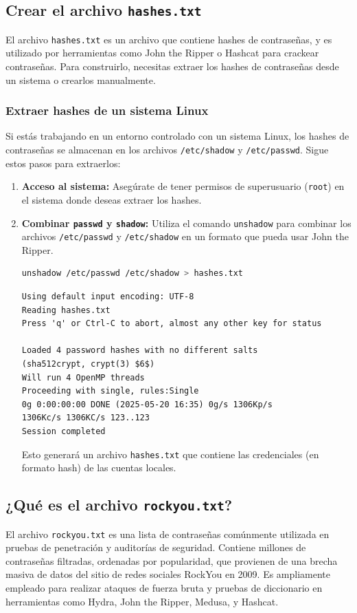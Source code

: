 \documentclass[12pt,a4paper]{article}
\begin{document}
\subsection*{Crear el archivo \texttt{hashes.txt}}
El archivo \texttt{hashes.txt} es un archivo que contiene hashes de contraseñas, y es utilizado por herramientas como John the Ripper o Hashcat para crackear contraseñas. Para construirlo, necesitas extraer los hashes de contraseñas desde un sistema o crearlos manualmente.

\subsubsection*{Extraer hashes de un sistema Linux}
Si estás trabajando en un entorno controlado con un sistema Linux, los hashes de contraseñas se almacenan en los archivos \texttt{/etc/shadow} y \texttt{/etc/passwd}. Sigue estos pasos para extraerlos:

\begin{enumerate}
    \item \textbf{Acceso al sistema:} Asegúrate de tener permisos de superusuario (\texttt{root}) en el sistema donde deseas extraer los hashes.
    \item \textbf{Combinar \texttt{passwd} y \texttt{shadow}:} Utiliza el comando \texttt{unshadow} para combinar los archivos \texttt{/etc/passwd} y \texttt{/etc/shadow} en un formato que pueda usar John the Ripper.
    \begin{lstlisting}[language=bash,breaklines=true]
unshadow /etc/passwd /etc/shadow > hashes.txt
    \end{lstlisting}
    \begin{verbatim}
Using default input encoding: UTF-8
Reading hashes.txt
Press 'q' or Ctrl-C to abort, almost any other key for status

Loaded 4 password hashes with no different salts 
(sha512crypt, crypt(3) $6$)
Will run 4 OpenMP threads
Proceeding with single, rules:Single
0g 0:00:00:00 DONE (2025-05-20 16:35) 0g/s 1306Kp/s 
1306Kc/s 1306KC/s 123..123
Session completed
    \end{verbatim}
    Esto generará un archivo \texttt{hashes.txt} que contiene las credenciales (en formato hash) de las cuentas locales.
\end{enumerate}

\subsection*{¿Qué es el archivo \texttt{rockyou.txt}?}
El archivo \texttt{rockyou.txt} es una lista de contraseñas comúnmente utilizada en pruebas de penetración y auditorías de seguridad. Contiene millones de contraseñas filtradas, ordenadas por popularidad, que provienen de una brecha masiva de datos del sitio de redes sociales RockYou en 2009. Es ampliamente empleado para realizar ataques de fuerza bruta y pruebas de diccionario en herramientas como Hydra, John the Ripper, Medusa, y Hashcat.
\end{document}
